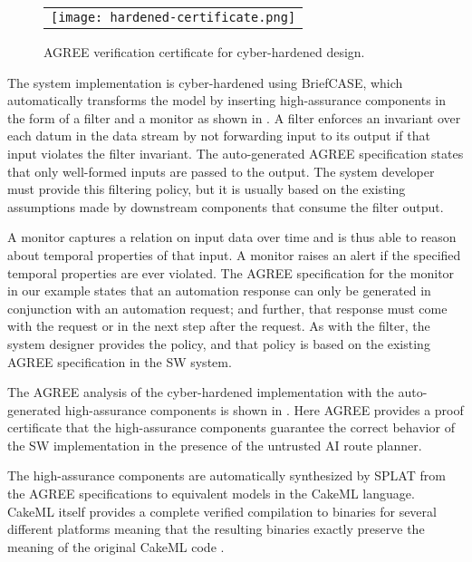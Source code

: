\begin{figure}
  \begin{center}
    \begin{tabular}{c}
      \texttt{[image: hardened-certificate.png]}
    \end{tabular}
  \end{center}
  \caption{AGREE verification certificate for cyber-hardened design.}
  \label{fig:hardened-certificate}
\end{figure}

The system implementation is cyber-hardened using BriefCASE, which automatically transforms the model by inserting high-assurance components in the form of a filter and a monitor as shown in .
A filter enforces an invariant over each datum in the data stream by not forwarding input to its output if that input violates the filter invariant.
The auto-generated AGREE specification states that only well-formed inputs are passed to the output.
The system developer must provide this filtering policy, but it is usually based on the existing assumptions made by downstream components that consume the filter output. 

A monitor captures a relation on input data over time and is thus able to reason about temporal properties of that input.
A monitor raises an alert if the specified temporal properties are ever violated.
The AGREE specification for the monitor in our example states that an automation response can only be generated in conjunction with an automation request; and further, that response must come with the request or in the next step after the request.
As with the filter, the system designer provides the policy, and that policy is based on the existing AGREE specification in the SW system.

The AGREE analysis of the cyber-hardened implementation with the auto-generated high-assurance components is shown in .
Here AGREE provides a proof certificate that the high-assurance components guarantee the correct behavior of the SW implementation in the presence of the untrusted AI route planner.

The high-assurance components are automatically synthesized by SPLAT from the AGREE specifications to equivalent models in the CakeML language.
CakeML itself provides a complete verified compilation to binaries for several different platforms meaning that the resulting binaries exactly preserve the meaning of the original CakeML code \cite{cakeml}. 

